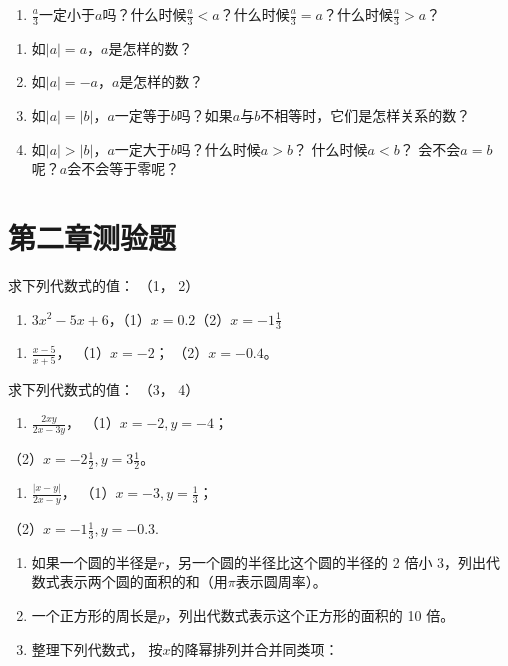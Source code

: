 \begin{enumerate}[start=18]
\item
  \(\frac{a}{3}\)一定小于\(a\)吗？什么时候\(\frac{a}{3} < a\)？什么时候\(\frac{a}{3} = a\)？什么时候\(\frac{a}{3} > a\)？
\end{enumerate}

\begin{enumerate}[start=19]
\item
  如\(|a| = a\)，\(a\)是怎样的数？
\item
  如\(|a| = -a\)，\(a\)是怎样的数？
\item
  如\(|a| = |b|\)，\(a\)一定等于\(b\)吗？如果\(a\)与\(b\)不相等时，它们是怎样关系的数？
\item
  如\(|a| > |b|\)，\(a\)一定大于\(b\)吗？什么时候\(a > b\)？
  什么时候\(a < b\)？ 会不会\(a = b\)呢？\(a\)会不会等于零呢？
\end{enumerate}

\section{第二章测验题}

求下列代数式的值： （1， 2）

\begin{enumerate}[start=1]
\item
  \(3x^{2} - 5x + 6\)，（1）\(x = 0.2\)（2）\(x = -1\frac{1}{3}\)
\end{enumerate}

\begin{enumerate}[start=2]
\item
  \(\frac{x - 5}{x + 5}\)， （1）\(x = -2\)； （2）\(x = -0.4\)。
\end{enumerate}

求下列代数式的值： （3， 4）

\begin{enumerate}[start=3]
\item
  \(\frac{2xy}{2x - 3y}\)， （1）\(x = -2, y = -4\)；
\end{enumerate}

（2）\(x = -2\frac{1}{2}, y = 3\frac{1}{2}\)。

\begin{enumerate}[start=4]
\item
  \(\frac{|x - y|}{2x - y}\)， （1）\(x = -3, y = \frac{1}{3}\)；
\end{enumerate}

（2）\(x = -1\frac{1}{3}, y = -0.3.\)

\begin{enumerate}[start=5]
\item
  如果一个圆的半径是\(r\)，另一个圆的半径比这个圆的半径的 2 倍小
  3，列出代数式表示两个圆的面积的和（用\(\pi\)表示圆周率）。
\item
  一个正方形的周长是\(p\)，列出代数式表示这个正方形的面积的 10 倍。
\item
  整理下列代数式， 按\(x\)的降幂排列并合并同类项：
\end{enumerate}

